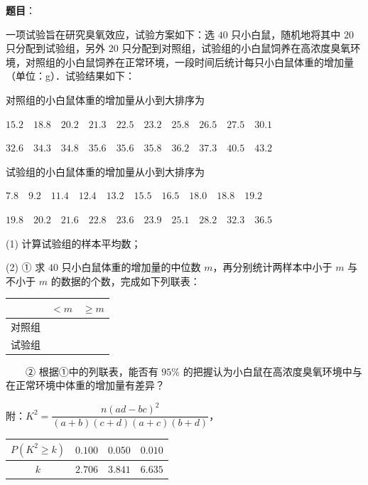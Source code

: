 \begin{answer}

\textbf{题目}：

一项试验旨在研究臭氧效应，试验方案如下：选 $40$ 只小白鼠，随机地将其中 $20$ 只分配到试验组，另外 $20$ 只分配到对照组，试验组的小白鼠饲养在高浓度臭氧环境，对照组的小白鼠饲养在正常环境，一段时间后统计每只小白鼠体重的增加量（单位：g）．试验结果如下：

对照组的小白鼠体重的增加量从小到大排序为

$15.2\quad18.8\quad20.2\quad21.3\quad22.5\quad23.2\quad25.8\quad26.5\quad27.5\quad30.1$

$32.6\quad34.3\quad34.8\quad35.6\quad35.6\quad35.8\quad36.2\quad37.3\quad40.5\quad43.2$

试验组的小白鼠体重的增加量从小到大排序为

$7.8\quad9.2\quad11.4\quad12.4\quad13.2\quad15.5\quad16.5\quad18.0\quad18.8\quad19.2$

$19.8\quad20.2\quad21.6\quad22.8\quad23.6\quad23.9\quad25.1\quad28.2\quad32.3\quad36.5$

  (1) 计算试验组的样本平均数；

  (2) ① 求 $40$ 只小白鼠体重的增加量的中位数 $m$，再分别统计两样本中小于 $m$ 与不小于 $m$ 的数据的个数，完成如下列联表：

\begin{center}
\begin{tabular}{ccc}
\toprule
 & $<m$ & $\geqslant m$ \\
\midrule
对照组 &  &  \\
试验组 &  &  \\
\bottomrule
\end{tabular}
\end{center}

　　② 根据①中的列联表，能否有 $95\%$ 的把握认为小白鼠在高浓度臭氧环境中与在正常环境中体重的增加量有差异？

附：$K^2=\dfrac{n(ad-bc)^2}{(a+b)(c+d)(a+c)(b+d)}$，

\begin{center}
\begin{tabular}{cccc}
\toprule
$P(K^2\geqslant k)$ & $0.100$ & $0.050$ & $0.010$ \\
\midrule
$k$ & $2.706$ & $3.841$ & $6.635$ \\
\bottomrule
\end{tabular}
\end{center}



\end{answer}
